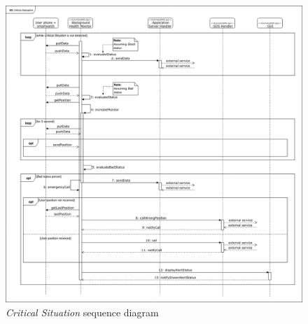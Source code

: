 \begin{figure}[H]
  \begin{center}
  	\includegraphics[width=\textwidth]{./img/sequence/criticalSituation.png}
    \hspace{0.05\linewidth}
    \centering
    \caption{\textit{Critical Situation} sequence diagram}
		\label{img:criticalSituation}
    \end{center}
\end{figure}

